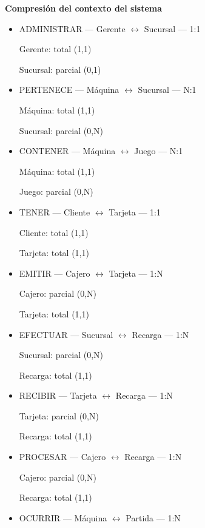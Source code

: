 \item \textbf{Compresión del contexto del sistema}

\begin{itemize}

          \item ADMINISTRAR — Gerente $\leftrightarrow$ Sucursal — 1:1
          
Gerente: total (1,1)

Sucursal: parcial (0,1)

          \item PERTENECE — Máquina $\leftrightarrow$ Sucursal — N:1
          
Máquina: total (1,1)

Sucursal: parcial (0,N)

          \item CONTENER — Máquina $\leftrightarrow$ Juego — N:1
          
Máquina: total (1,1)

Juego: parcial (0,N)


          \item TENER — Cliente $\leftrightarrow$ Tarjeta — 1:1
          
Cliente: total (1,1)

Tarjeta: total (1,1)

          \item EMITIR — Cajero $\leftrightarrow$ Tarjeta — 1:N
          
Cajero: parcial (0,N)

Tarjeta: total (1,1)

          \item EFECTUAR — Sucursal $\leftrightarrow$ Recarga — 1:N
          
Sucursal: parcial (0,N)

Recarga: total (1,1)

          \item RECIBIR — Tarjeta $\leftrightarrow$ Recarga — 1:N
          
Tarjeta: parcial (0,N)

Recarga: total (1,1)

          \item PROCESAR — Cajero $\leftrightarrow$ Recarga — 1:N
          
Cajero: parcial (0,N)

Recarga: total (1,1)

          \item OCURRIR — Máquina $\leftrightarrow$ Partida — 1:N
          

\end{itemize}
